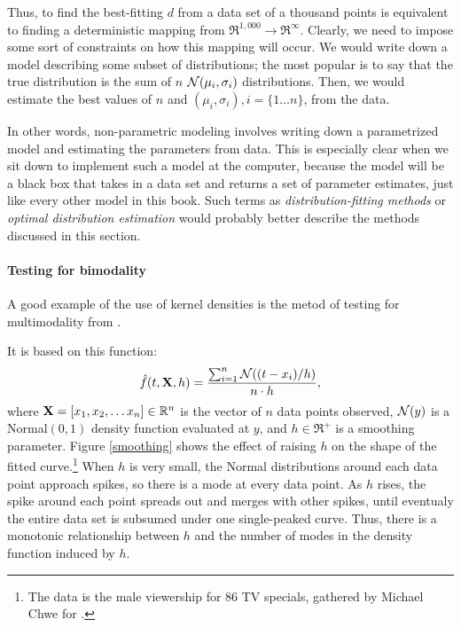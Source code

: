 Thus, to find the best-fitting $d$ from a data set of a thousand points
is equivalent to finding a deterministic mapping from $\Re^{1,000}
\to \Re^\infty$.  Clearly, we need to impose some sort of constraints
on how this mapping will occur. We would write down a model describing
some subset of distributions; the most popular is to say that the
true distribution is the sum of $n$ ${\cal N}(\mu_i, \sigma_i)$
distributions. Then, we would estimate the best values of $n$ and
$(\mu_i, \sigma_i), i =\{1\dots n\}$, from the data.  

In other words, non-parametric modeling involves writing down a
para\-metrized model and estimating the parameters from data.  This is
especially clear when we sit down to implement such a model at the
computer, because the model will be a black box that takes in a data set
and returns a set of parameter estimates, just like every other model in
this book. 
Such terms as {\em distribution-fitting methods} or {\em optimal
distribution estimation} would probably better describe the methods
discussed in this section.


\paragraph{Testing for bimodality}
A good example of the use of kernel densities is the metod of testing
for multimodality from \citet{silverman:boot}.

It is based on this function:
\begin{equation}
	\hat f(t,{\bf X},h)={{\sum_{i=1}^n{\cal N}((t-x_i)/h)\over n\cdot
h}},\label{bikernel}
\end{equation}
where ${\bf X} = [x_1, x_2,\dots x_n] \in {\mathbb{R}}^n$ is the vector
of $n$ data points observed, ${\cal N}(y)$ is a Normal$(0,1)$
density function evaluated at $y$, and $h\in \Re^+$ is a smoothing
parameter. 
Figure \ref{smoothing} shows the effect of raising $h$ on the shape of
the fitted curve.\footnote{The data is the male viewership for 86 TV
specials, gathered by Michael Chwe for \citet{chwe:ritual}.} When
$h$ is very small, the Normal distributions around each data point
approach spikes, so there is a mode at every data point. As $h$ rises,
the spike around each point spreads out and merges with other spikes,
until eventualy the entire data set is subsumed under one single-peaked
curve. Thus, there is a monotonic relationship between $h$ and the number
of modes in the density function induced by $h$.

